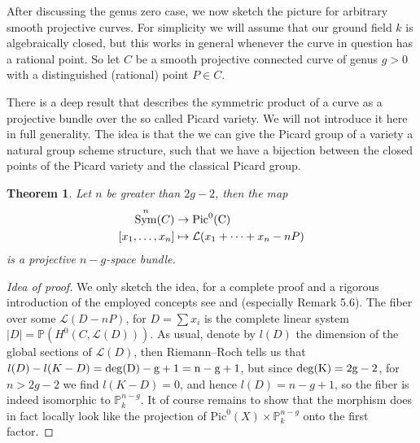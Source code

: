 \documentclass[11pt, a4paper, english, twoside]{article}
\theoremstyle{plain}
\newtheorem{theorem}{Theorem}[section]
\theoremstyle{definition}
\DeclareMathOperator{\Sym}{Sym}
\begin{document}

After discussing the genus zero case, we now sketch the picture for arbitrary smooth projective curves. 
For simplicity we will assume that our ground field $k$ is algebraically closed, but
this works in general whenever the curve in question has a rational point. 
So let $C$ be a smooth projective connected curve of genus $g > 0$ with a distinguished (rational) point $P \in C$.

There is a deep result that describes the symmetric product of a curve as a projective bundle over the so called Picard variety. We will
not introduce it here in full generality. The idea is that the we can give the Picard group of a variety a natural group scheme structure,
such that we have a bijection between the closed points of the Picard variety and the classical
Picard group. 

\begin{theorem}%
    Let $n$ be greater than $2g-2$, then the map  
    \begin{align*}
        \Sym^n(C) &\to \rm{Pic}^0(C) \\
        [x_1,\dots,x_n] &\mapsto \mathcal{L}(x_1 + \dots + x_n - nP)
    \end{align*}
    is a projective $n-g$-space bundle.
\end{theorem}
\begin{proof}[Idea of proof]
    We only sketch the idea, for a complete proof and a rigorous introduction of the employed concepts see \cite{schwarzenberger1963}
    and \cite[Chap. III.5]{milneAV} (especially Remark 5.6).
    The fiber over some $\mathcal{L}(D - nP)$, for $D = \sum x_i$ is the complete linear system $|D| = \mathbb{P}(H^0(C, \mathcal{L}(D)))$.
    As usual, denote by $l(D)$ the dimension of the global sections of $\mathcal{L}(D)$, then Riemann--Roch tells us 
    that $l(D) - l(K-D) = \rm{deg}(D) - g + 1 = n - g + 1$, but since $\rm{deg}(K) = 2g-2$, for $n > 2g-2$ we find $l(K-D) = 0$, and hence
    $l(D) = n-g+1$, so the fiber is indeed isomorphic to $\mathbb{P}_k^{n-g}$. It of course remains to show that the morphism does in
    fact locally look like the projection of $\mathrm{Pic}^0(X) \times \mathbb{P}_k^{n-g}$ onto the first factor.
\end{proof}
\end{document}

